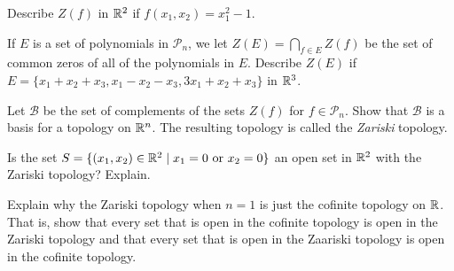\ba

\item Describe $Z(f)$ in $\mathbb{R}^2$ if $f(x_1,x_2) = x_1^2 - 1$. 

\item If $E$ is a set of polynomials in $\mathcal{P}_n$, we let $Z(E) = \bigcap_{f \in E} Z(f)$ be the set of common zeros of all of the polynomials in $E$. Describe $Z(E)$ if $E = \{x_1+x_2+x_3, x_1-x_2-x_3, 3x_1+x_2+x_3\}$ in $\mathbb{R}^3$. 


\item Let $\mathcal{B}$ be the set of complements of the sets $Z(f)$ for $f \in \mathcal{P}_n$. Show that $\mathcal{B}$ is a basis for a topology on $\mathbb{R}^n$. The resulting topology is called the \emph{Zariski} topology.

\item Is the set $S = \{(x_1,x_2) \in \mathbb{R}^2 \mid x_1 = 0 \text{ or } x_2 = 0\}$ an open set in $\mathbb{R}^2$ with the Zariski topology? Explain.  

\item Explain why the Zariski topology when $n=1$ is just the cofinite topology on $\mathbb{R}$. That is, show that every set that is open in the cofinite topology is open in the Zariski topology and that every set that is open in the Zaariski topology is open in the cofinite topology. 


\ea
 
